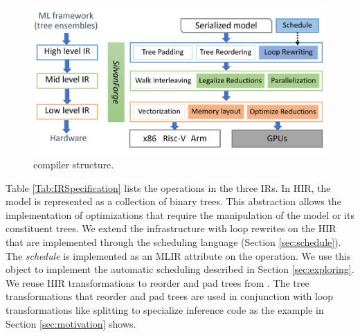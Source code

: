 \begin{figure}[htb]
  \centering
  \includegraphics[width=\linewidth]{figures/compiler.png}
  \caption{\Treebeard{} compiler structure.}
  \label{Fig:CompilerStructure}
\end{figure}

Table \ref{Tab:IRSpecification} lists the operations in the three IRs. 
In HIR, the model is represented as a collection of binary trees. This abstraction
allows the implementation of optimizations that require the manipulation of the model
or its constituent trees. We extend the \TreebeardOLD{} infrastructure with loop rewrites on 
the HIR that are implemented through the scheduling language (Section \ref{sec:schedule}).
The \emph{schedule} is implemented as an MLIR attribute on the  operation.
We use this object to implement the automatic scheduling described in Section \ref{sec:exploring}. 
We reuse HIR transformations to reorder and pad trees from \TreebeardOLD{}.
The tree transformations that reorder and pad trees are used in conjunction 
with loop transformations like splitting to specialize inference code as the example 
in Section \ref{sec:motivation} shows. 

